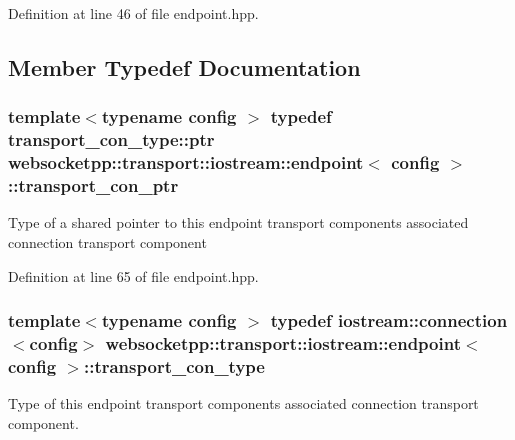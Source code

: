 Definition at line 46 of file endpoint.\+hpp.



\subsection{Member Typedef Documentation}
\subsubsection[{\texorpdfstring{transport\+\_\+con\+\_\+ptr}{transport\_con\_ptr}}]{\setlength{\rightskip}{0pt plus 5cm}template$<$typename config $>$ typedef {\bf transport\+\_\+con\+\_\+type\+::ptr} {\bf websocketpp\+::transport\+::iostream\+::endpoint}$<$ {\bf config} $>$\+::{\bf transport\+\_\+con\+\_\+ptr}}\hypertarget{classwebsocketpp_1_1transport_1_1iostream_1_1endpoint_a709bba4a4e1e2b7829abe4aa55de8078}{}\label{classwebsocketpp_1_1transport_1_1iostream_1_1endpoint_a709bba4a4e1e2b7829abe4aa55de8078}
Type of a shared pointer to this endpoint transport component\textquotesingle{}s associated connection transport component 

Definition at line 65 of file endpoint.\+hpp.

\subsubsection[{\texorpdfstring{transport\+\_\+con\+\_\+type}{transport\_con\_type}}]{\setlength{\rightskip}{0pt plus 5cm}template$<$typename config $>$ typedef {\bf iostream\+::connection}$<${\bf config}$>$ {\bf websocketpp\+::transport\+::iostream\+::endpoint}$<$ {\bf config} $>$\+::{\bf transport\+\_\+con\+\_\+type}}\hypertarget{classwebsocketpp_1_1transport_1_1iostream_1_1endpoint_a01827f94c5d01289975146f0438ee79b}{}\label{classwebsocketpp_1_1transport_1_1iostream_1_1endpoint_a01827f94c5d01289975146f0438ee79b}
Type of this endpoint transport component\textquotesingle{}s associated connection transport component. 

